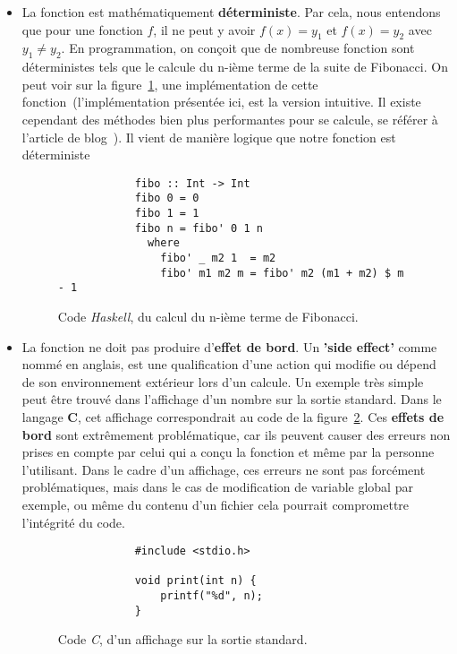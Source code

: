 \begin{itemize}
    \item[\textbullet] La fonction est mathématiquement 
    \textbf{déterministe}. Par cela, nous entendons que pour une fonction \(f\), 
    il ne peut y avoir \(f(x) = y_1\) et \(f(x) = y_2\) avec \(y_1 \neq y_2\). 
    En programmation, on conçoit que de nombreuse fonction 
    sont déterministes tels que le calcule du n-ième terme de la suite de 
    Fibonacci. On peut voir sur la figure~\ref{fig:progFiboHaskell}, une 
    implémentation de cette fonction~(l'implémentation présentée ici, est la 
    version intuitive. Il existe cependant des méthodes bien plus performantes 
    pour se calcule, se référer à l'article de blog~\cite{citationFiboProg}).
    Il vient de manière logique que notre fonction est déterministe
    \begin{figure}[H]
        \begin{verbatim}
            fibo :: Int -> Int
            fibo 0 = 0
            fibo 1 = 1
            fibo n = fibo' 0 1 n
              where
                fibo' _ m2 1  = m2
                fibo' m1 m2 m = fibo' m2 (m1 + m2) $ m - 1
        \end{verbatim}
        \caption{
            Code \textit{Haskell}, du calcul du n-ième terme de Fibonacci.
        }\label{fig:progFiboHaskell}
    \end{figure}

    \item[\textbullet] La fonction ne doit pas produire 
    d'\textbf{effet de bord}. Un \textbf{'side effect'} comme nommé en anglais, 
    est une qualification d'une action qui modifie ou dépend de son environnement 
    extérieur lors d'un calcule. Un exemple très simple peut être trouvé dans 
    l'affichage d'un nombre sur la sortie standard. Dans le langage \textbf{C},
    cet affichage correspondrait au code de la figure~\ref{fig:progAfficheC}.
    Ces \textbf{effets de bord} sont extrêmement problématique, car ils 
    peuvent causer des erreurs non prises en compte par celui qui a conçu la 
    fonction et même par la personne l'utilisant. Dans le cadre d'un affichage, 
    ces erreurs ne sont pas forcément problématiques, mais dans le cas de 
    modification de variable global par exemple, ou même du contenu d'un fichier
    cela pourrait compromettre l'intégrité du code.
    \begin{figure}[H]
        \begin{verbatim}
            #include <stdio.h>

            void print(int n) {
                printf("%d", n);
            }
        \end{verbatim}
        \caption{
            Code \textit{C}, d'un affichage sur la sortie standard.
        }\label{fig:progAfficheC}
    \end{figure}
\end{itemize}

